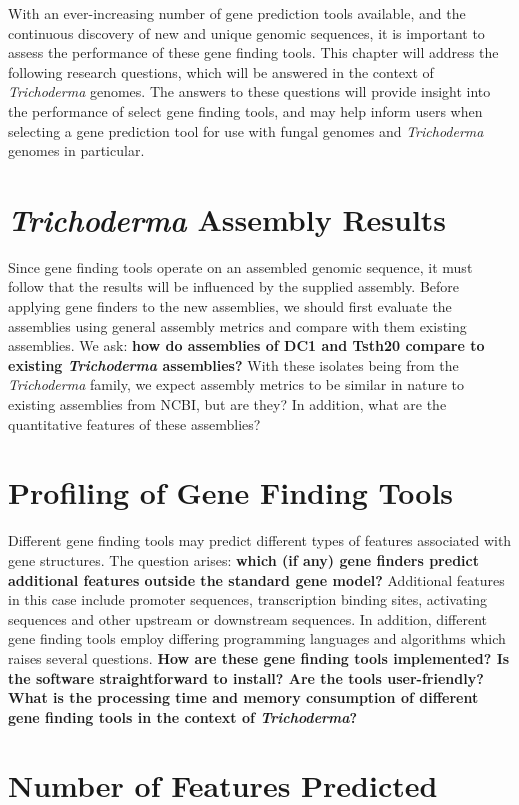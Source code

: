 With an ever-increasing number of gene prediction tools available, and the continuous discovery of new and unique genomic sequences, it is important to assess the performance of these gene finding tools. This chapter will address the following research questions, which will be answered in the context of \textit{Trichoderma} genomes. The answers to these questions will provide insight into the performance of select gene finding tools, and may help inform users when selecting a gene prediction tool for use with fungal genomes and \textit{Trichoderma} genomes in particular.

\section{\textit{Trichoderma} Assembly Results}
\label{rq:assembly-results}
Since gene finding tools operate on an assembled genomic sequence, it
must follow that the results will be influenced by the supplied
assembly. Before applying gene finders to the new assemblies, we
should first evaluate the assemblies using general assembly metrics and compare with them existing assemblies. We ask: \textbf{how do assemblies of DC1 and
  Tsth20 compare to existing \textit{Trichoderma} assemblies?} With
these isolates being from the \textit{Trichoderma} family, we expect
assembly metrics to be similar in nature to existing assemblies from
NCBI, but are they? In addition, what are the quantitative features of these assemblies?

\section{Profiling of Gene Finding Tools}
Different gene finding tools may predict different types of features
associated with gene structures. The question arises: \textbf{which
  (if any) gene finders predict additional features outside the
  standard gene model?} Additional features in this case include
promoter sequences, transcription binding sites, activating sequences
and other upstream or downstream sequences. In addition, different
gene finding tools employ differing programming languages and
algorithms which raises several questions. \textbf{How are these gene
  finding tools implemented? Is the software straightforward to
  install? Are the tools user-friendly? What is the processing time
  and memory consumption of different gene finding tools in the
  context of \textit{Trichoderma}?}

\section{Number of Features Predicted}
\label{rq:number-of-features}  

